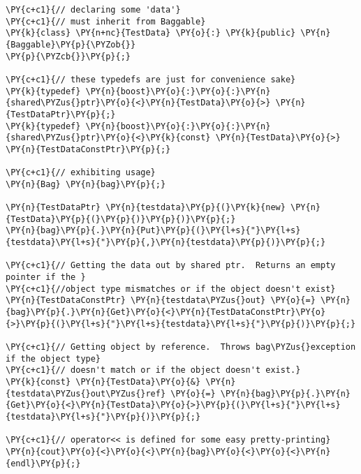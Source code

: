 \begin{Verbatim}[commandchars=\\\{\}]
\PY{c+c1}{// declaring some 'data'}
\PY{c+c1}{// must inherit from Baggable}
\PY{k}{class} \PY{n+nc}{TestData} \PY{o}{:} \PY{k}{public} \PY{n}{Baggable}\PY{p}{\PYZob{}}
\PY{p}{\PYZcb{}}\PY{p}{;}

\PY{c+c1}{// these typedefs are just for convenience sake}
\PY{k}{typedef} \PY{n}{boost}\PY{o}{:}\PY{o}{:}\PY{n}{shared\PYZus{}ptr}\PY{o}{<}\PY{n}{TestData}\PY{o}{>} \PY{n}{TestDataPtr}\PY{p}{;}
\PY{k}{typedef} \PY{n}{boost}\PY{o}{:}\PY{o}{:}\PY{n}{shared\PYZus{}ptr}\PY{o}{<}\PY{k}{const} \PY{n}{TestData}\PY{o}{>} \PY{n}{TestDataConstPtr}\PY{p}{;}

\PY{c+c1}{// exhibiting usage}
\PY{n}{Bag} \PY{n}{bag}\PY{p}{;}

\PY{n}{TestDataPtr} \PY{n}{testdata}\PY{p}{(}\PY{k}{new} \PY{n}{TestData}\PY{p}{(}\PY{p}{)}\PY{p}{)}\PY{p}{;}
\PY{n}{bag}\PY{p}{.}\PY{n}{Put}\PY{p}{(}\PY{l+s}{"}\PY{l+s}{testdata}\PY{l+s}{"}\PY{p}{,}\PY{n}{testdata}\PY{p}{)}\PY{p}{;}

\PY{c+c1}{// Getting the data out by shared ptr.  Returns an empty pointer if the }
\PY{c+c1}{//object type mismatches or if the object doesn't exist}
\PY{n}{TestDataConstPtr} \PY{n}{testdata\PYZus{}out} \PY{o}{=} \PY{n}{bag}\PY{p}{.}\PY{n}{Get}\PY{o}{<}\PY{n}{TestDataConstPtr}\PY{o}{>}\PY{p}{(}\PY{l+s}{"}\PY{l+s}{testdata}\PY{l+s}{"}\PY{p}{)}\PY{p}{;}

\PY{c+c1}{// Getting object by reference.  Throws bag\PYZus{}exception if the object type}
\PY{c+c1}{// doesn't match or if the object doesn't exist.}
\PY{k}{const} \PY{n}{TestData}\PY{o}{&} \PY{n}{testdata\PYZus{}out\PYZus{}ref} \PY{o}{=} \PY{n}{bag}\PY{p}{.}\PY{n}{Get}\PY{o}{<}\PY{n}{TestData}\PY{o}{>}\PY{p}{(}\PY{l+s}{"}\PY{l+s}{testdata}\PY{l+s}{"}\PY{p}{)}\PY{p}{;}

\PY{c+c1}{// operator<< is defined for some easy pretty-printing}
\PY{n}{cout}\PY{o}{<}\PY{o}{<}\PY{n}{bag}\PY{o}{<}\PY{o}{<}\PY{n}{endl}\PY{p}{;}
\end{Verbatim}
